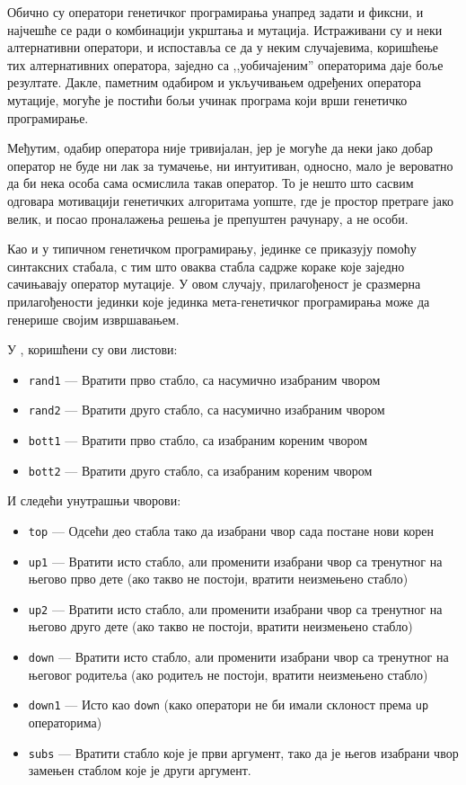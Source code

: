 \documentclass[a4paper]{article}
\begin{document}
Обично су оператори генетичког програмирања унапред задати и фиксни, и најчешће се ради о комбинацији укрштања и мутација. Истраживани су и неки алтернативни оператори, и испоставља се да у неким случајевима, коришћење тих алтернативних оператора, заједно са ,,уобичајеним'' операторима даје боље резултате. Дакле, паметним одабиром и укључивањем одређених оператора мутације, могуће је постићи бољи учинак програма који врши генетичко програмирање.


Међутим, одабир оператора није тривијалан, јер је могуће да неки јако добар оператор не буде ни лак за тумачење, ни интуитиван, односно, мало је вероватно да би нека особа сама осмислила такав оператор. То је нешто што сасвим одговара мотивацији генетичких алгоритама уопште, где је простор претраге јако велик, и посао проналажења решења је препуштен рачунару, а не особи.


Као и у типичном генетичком програмирању, јединке се приказују помоћу синтаксних стабала, с тим што оваква стабла садрже кораке које заједно сачињавају оператор мутације. У овом случају, прилагођеност је сразмерна прилагођености јединки које јединка мета-генетичког програмирања може да генерише својим извршавањем. 


У \cite{edmonds2001meta}, коришћени су ови листови:
\begin{itemize}
    \item \texttt{rand1} — Вратити прво стабло, са насумично изабраним чвором
    \item \texttt{rand2} — Вратити друго стабло, са насумично изабраним чвором
    \item \texttt{bott1} — Вратити прво стабло, са изабраним кореним чвором
    \item \texttt{bott2} — Вратити друго стабло, са изабраним кореним чвором
\end{itemize}

И следећи унутрашњи чворови:

\begin{itemize}
    \item \texttt{top} — Одсећи део стабла тако да изабрани чвор сада постане нови корен
    \item \texttt{up1} — Вратити исто стабло, али променити изабрани чвор са тренутног на његово прво дете (ако такво не постоји, вратити неизмењено стабло)
    \item \texttt{up2} — Вратити исто стабло, али променити изабрани чвор са тренутног на његово друго дете (ако такво не постоји, вратити неизмењено стабло)
    \item \texttt{down} — Вратити исто стабло, али променити изабрани чвор са тренутног на његовог родитеља (ако родитељ не постоји, вратити неизмењено стабло) 
    \item \texttt{down1} — Исто као \texttt{down} (како оператори не би имали склоност према \texttt{up} операторима)
    \item \texttt{subs} — Вратити стабло које је први аргумент, тако да је његов изабрани чвор замењен стаблом које је други аргумент.
\end{itemize}
\end{document}
